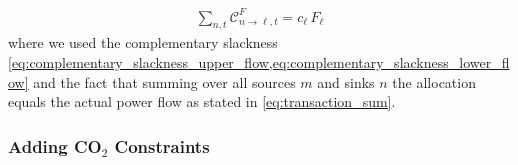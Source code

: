 \documentclass[11pt]{article}
\newcommand{\note}[1]{\textcolor{Orange}{#1}}
\newcommand{\generation}[1][n]{g_{#1,s,t}}
\newcommand{\capacityFlow}{F_{\ell}}
\newcommand{\capexFlow}{c_{\ell}}
\newcommand{\demand}[1][n]{d_{#1,a,t}}
\newcommand{\incidence}[1][n]{K_{#1,\ell}}
\newcommand{\lmp}[1][n]{\lambda_{#1,t}}
\newcommand{\flow}{f_{\ell,t}}
\newcommand{\allocateCapexFlow}[1][n]{\mathcal{C}^{F}_{#1,t}}
\newcommand{\Forall}[1]{\hspace{20pt} \forall \,\, #1 }
\begin{document}
\begin{align}
 \sum_{n,t} \allocateCapexFlow[n \rightarrow \ell] = \capexFlow \, \capacityFlow  
\end{align}
where we used the complementary slackness \cref{eq:complementary_slackness_upper_flow,eq:complementary_slackness_lower_flow} and the fact that summing over all sources $m$ and sinks $n$ the allocation equals the actual power flow as stated in \cref{eq:transaction_sum}. 


\subsubsection*{Adding CO$_2$ Constraints}
\end{document}
